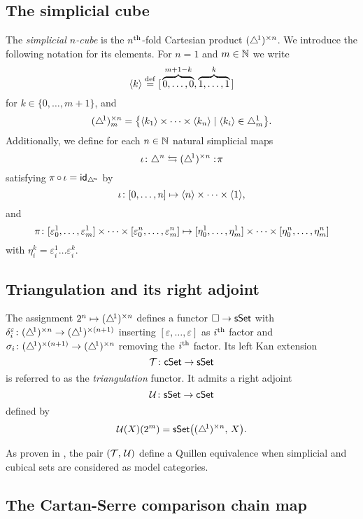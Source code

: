 \subsection{The simplicial cube} \label{ss:simplicial cube}

The \textit{simplicial $n$-cube} is the $n^{\mathrm{th}}$-fold Cartesian product $(\triangle^{\!1})^{\times n}$.
We introduce the following notation for its elements.
For $n = 1$ and $m \in \mathbb{N}$ we write
\[
\langle k \rangle \stackrel{\mathrm{def}}{=} [\, \overbrace{0, \dots, 0}^{m+1-k}, \overbrace{1, \dots, 1}^{k}\,]
\]
for $k \in \{0, \dots, m+1\}$, and
\[
(\triangle^{\!1})^{\times n}_m = \big\{ \langle k_1\rangle \times \dots \times \langle k_n\rangle \mid \langle k_i\rangle \in \triangle^1_m \big\}.
\]
Additionally, we define for each $n \in \mathbb{N}$ natural simplicial maps
\[
\operatorname{\iota} \colon \triangle^n \leftrightarrows (\triangle^{\!1})^{\times n} :\! \operatorname{\pi}
\]
satisfying $\operatorname{\pi} \circ \operatorname{\iota} = \mathsf{id}_{\triangle^{\!n}}$ by
\[
\operatorname{\iota} \colon [0, \dots, n] \mapsto \langle n\rangle \times \dots \times \langle1\rangle,
\]
and
\[
\operatorname{\pi} \colon [\varepsilon_0^1, \dots, \varepsilon_m^1] \times \dots \times [ \varepsilon_0^n, \dots, \varepsilon_m^n] \mapsto
[\eta_0^1, \dots, \eta_m^1] \times \dots \times [ \eta_0^n, \dots, \eta_m^n]
\]
with $\eta_i^k = \varepsilon_i^1 \dots \varepsilon_i^k$.

\subsection{Triangulation and its right adjoint}

The assignment $2^n \mapsto (\triangle^{\!1})^{\times n}$ defines a functor $\square \to \mathsf{sSet}$ with $\delta_i^\varepsilon \colon (\triangle^{\!1})^{\times n} \to (\triangle^{\!1})^{\times (n+1)}$ inserting $[\varepsilon, \dots, \varepsilon]$ as $i^{\mathrm{th}}$ factor and $\sigma_i \colon (\triangle^{\!1})^{\times (n+1)} \to (\triangle^{\!1})^{\times n}$ removing the $i^{\mathrm{th}}$ factor.
Its left Kan extension
\[
\operatorname{\mathcal{T}} \colon \mathsf{cSet} \to \mathsf{sSet}
\]
is referred to as the \textit{triangulation} functor.
It admits a right adjoint
\[
\operatorname{\mathcal{U}} \colon \mathsf{sSet} \to \mathsf{cSet}
\]
defined by
\[
\operatorname{\mathcal{U}}(X)(2^m) = \mathsf{sSet} \big( (\triangle^{\!1})^{\times n}, \, X \big).
\]

As proven in \cite[8.4.30]{cisinski2006presheaves}, the pair $(\operatorname{\mathcal{T}},\, \operatorname{\mathcal{U}})$ define a Quillen equivalence when simplicial and cubical sets are considered as model categories.

\subsection{The Cartan-Serre comparison chain map} \label{ss:comparison map}

